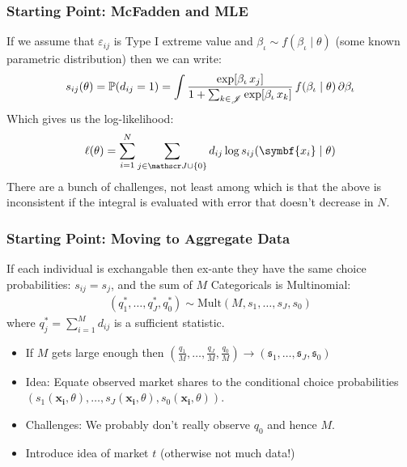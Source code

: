 \documentclass[aspectratio=169,10pt]{beamer}
\begin{document}
\begin{frame}
\frametitle{Starting Point: McFadden and MLE}
If we assume that $\varepsilon_{ij}$ is Type I extreme value and $\beta_{\iota} \sim f(\beta_{\iota} \mid \theta)$ (some known parametric distribution) then we can write:
\begin{align*}
s_{ij}(\theta)= \mathbb{P}(d_{ij}=1) = \int \frac{\exp[\beta_{\iota} \, x_j]}{1+\sum_{k \in \mathscr{J}} \exp[\beta_{\iota} \, x_k]}\, f(\beta_{\iota} \mid \theta)\, \partial \beta_{\iota}
\end{align*}
Which gives us the log-likelihood:
 \begin{align*}
 \ell(\theta) = \sum_{i=1}^N \sum_{j \in \calJ \cup \{0\}} d_{ij} \log s_{ij}(\symbf{x_i} \mid \theta)
 \end{align*}
 There are a bunch of challenges, not least among which is that the above is \alert{inconsistent} if the integral is evaluated with error that doesn't decrease in $N$.
\end{frame}







\begin{frame}
\frametitle{Starting Point: Moving to Aggregate Data}
If each individual is \alert{exchangable} then ex-ante they have the same choice probabilities: $s_{ij}=s_j$, and the sum of $M$ Categoricals is Multinomial:
\begin{align*}
(q_{1}^{*},\ldots,q_{J}^{*},q_{0}^{*}) \sim \text{Mult} (M, s_{1},\ldots,s_{J},s_{0} ) 
\end{align*}
where $q_{j}^{*}=\sum_{i=1}^M d_{ij}$ is a \alert{sufficient statistic}. 
\begin{itemize}
\item If $M$ gets large enough then $(\frac{q_1}{M},\ldots,\frac{q_J}{M},\frac{q_0}{M})\rightarrow (\mathfrak{s}_1,\ldots,\mathfrak{s}_J,\mathfrak{s}_0)$
 \item Idea: Equate observed market shares to the conditional choice probabilities $(s_1(\symbf{x_i},\theta),\ldots,s_J(\symbf{x_i},\theta),s_0(\symbf{x_i},\theta))$.
\item  Challenges: We probably don't really observe $q_0$ and hence $M$.
\item Introduce idea of market $t$ (otherwise not much data!)
\end{itemize}
\end{frame}
\end{document}
